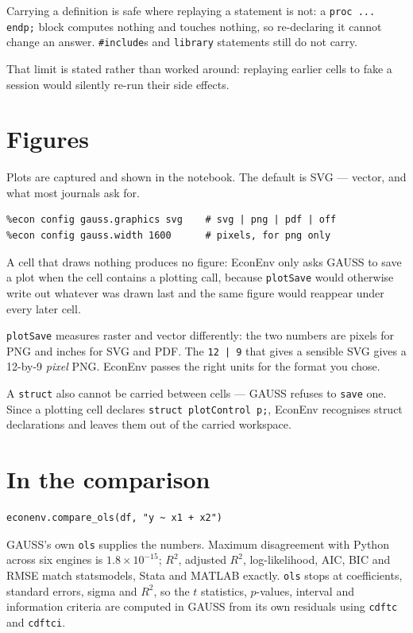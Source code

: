 \documentclass[11pt,a4paper]{report}
\begin{document}
Carrying a definition is safe where replaying a statement is not: a
\texttt{proc ... endp;} block computes nothing and touches nothing, so
re-declaring it cannot change an answer. \texttt{\#include}s and
\texttt{library} statements still do not carry.

That limit is stated rather than worked around: replaying earlier cells to fake
a session would silently re-run their side effects.

\section{Figures}

Plots are captured and shown in the notebook. The default is SVG --- vector,
and what most journals ask for.

\begin{lstlisting}
%econ config gauss.graphics svg    # svg | png | pdf | off
%econ config gauss.width 1600      # pixels, for png only
\end{lstlisting}

A cell that draws nothing produces no figure: EconEnv only asks GAUSS to save
a plot when the cell contains a plotting call, because \texttt{plotSave} would
otherwise write out whatever was drawn last and the same figure would reappear
under every later cell.

\begin{warn}
\texttt{plotSave} measures raster and vector differently: the two numbers are
pixels for PNG and inches for SVG and PDF. The \texttt{12 | 9} that gives a
sensible SVG gives a 12-by-9 \emph{pixel} PNG. EconEnv passes the right units
for the format you chose.

A \texttt{struct} also cannot be carried between cells --- GAUSS refuses to
\texttt{save} one. Since a plotting cell declares \texttt{struct plotControl p;},
EconEnv recognises struct declarations and leaves them out of the carried
workspace.
\end{warn}

\section{In the comparison}

\begin{lstlisting}
econenv.compare_ols(df, "y ~ x1 + x2")
\end{lstlisting}

GAUSS's own \texttt{ols} supplies the numbers. Maximum disagreement with Python
across six engines is $1.8\times10^{-15}$; $R^2$, adjusted $R^2$,
log-likelihood, AIC, BIC and RMSE match statsmodels, Stata and MATLAB exactly.
\texttt{ols} stops at coefficients, standard errors, sigma and $R^2$, so the
$t$ statistics, $p$-values, interval and information criteria are computed in
GAUSS from its own residuals using \texttt{cdftc} and \texttt{cdftci}.
\end{document}
